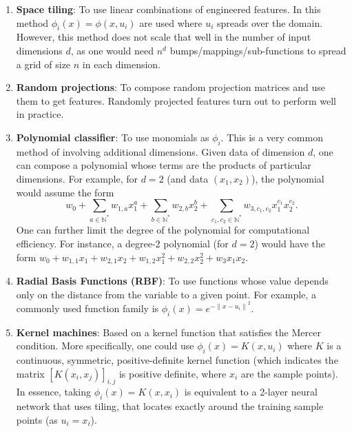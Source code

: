 \begin{enumerate}
    \item \textbf{Space tiling}: To use linear combinations of engineered features.
    In this method $\phi_i(x) = \phi(x,u_i)$ are used where $u_i$ spreads over the domain.
    However, this method does not scale that well in the number of input dimensions $d$, as one would need $n^d$ bumps/mappings/sub-functions to spread a grid of size $n$ in each dimension.

    \item \textbf{Random projections}: To compose random projection matrices and use them to get features.
    Randomly projected features turn out to perform well in practice.

    \item \textbf{Polynomial classifier}: To use monomials as $\phi_i$.
    This is a very common method of involving additional dimensions.
    Given data of dimension $d$, one can compose a polynomial whose terms are the products of particular dimensions.
    For example, for $d = 2$ (and data $(x_1, x_2)$), the polynomial would assume the form
    \begin{equation*}
        w_0 + \sum_{a \in \mathbb{N}^*} w_{1, a} x_1^a + \sum_{b \in \mathbb{N}^*} w_{2, b} x_2^b + \sum_{c_1, c_2 \in \mathbb{N}^*} w_{3, c_1, c_2} x_1^{c_1} x_2^{c_2}
        \text{.}
    \end{equation*}
    One can further limit the degree of the polynomial for computational efficiency.
    For instance, a degree-2 polynomial (for $d = 2$) would have the form $w_0 + w_{1, 1} x_1 + w_{2, 1} x_2 + w_{1, 2} x_1^2 + w_{2, 2} x_2^2 + w_3 x_1 x_2$.

    \item \textbf{Radial Basis Functions (RBF)}: To use functions whose value depends only on the distance from the variable to a given point.
    For example, a commonly used function family is $\phi_i(x)=e^{-{\|x-u_i\|}^2}$.

    \item \textbf{Kernel machines}: Based on a kernel function that satisfies the Mercer condition.
    More specifically, one could use $\phi_i(x) = K(x, u_i)$ where $K$ is a continuous, symmetric, positive-definite kernel function (which indicates the matrix $[K(x_i, x_j)]_{i, j}$ is positive definite, where $x_i$ are the sample points).
    In essence, taking $\phi_i(x) = K(x, x_i)$ is equivalent to a 2-layer neural network that uses tiling, that locates exactly around the training sample points (as $u_i = x_i$).
\end{enumerate}

